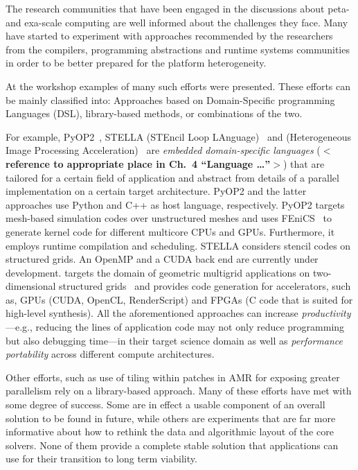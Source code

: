 The research communities that have been engaged in the discussions
about peta- and exa-scale computing are well informed about the
challenges they face.
\textcolor{fhcolor}{Many have started to experiment with approaches
recommended by the researchers from the compilers, programming
abstractions and runtime systems communities in order to be better
prepared for the platform heterogeneity.}%

At the workshop examples of many such efforts were presented.
\textcolor{fhcolor}{These efforts can be mainly classified into:
Approaches based on Domain-Specific programming Languages (DSL),
library-based methods, or combinations of the two.}

\textcolor{fhcolor}{
For example, PyOP2~\cite{PyOP2}, STELLA (STEncil Loop LAnguage)~\cite{STELLA14}
and \hipacc (Heterogeneous Image Processing Acceleration)~\cite{MHTKE12a} are
\emph{embedded domain-specific languages} (\textbf{$<$reference to appropriate place in Ch.~4 ``Language \ldots''$>$})
that are tailored for a certain field of application and abstract from details
of a parallel implementation on a certain target architecture. 
PyOP2 and the latter approaches use Python and C++ as host language,
respectively.
PyOP2 targets mesh-based simulation codes over unstructured meshes and uses
FEniCS~\cite{fenics} to generate kernel code for different multicore CPUs and GPUs.
Furthermore, it employs runtime compilation and scheduling.
STELLA considers stencil codes on structured grids. An OpenMP and a CUDA back
end are currently under development.  
\hipacc targets the domain of geometric multigrid applications on
two-dimensional structured grids~\cite{MHTK12} and provides code generation for
accelerators, such as, GPUs (CUDA, OpenCL, RenderScript) and FPGAs (C code that
is suited for high-level synthesis).
All the aforementioned approaches can increase \emph{productivity}---e.g.,
reducing the lines of application code may not only reduce programming but also
debugging time---in their target science domain as well as \emph{performance
portability} across different compute architectures.}

Other efforts, such as use of tiling within patches in AMR for
exposing greater parallelism rely on a library-based approach.
Many of these efforts
have met with some degree of success. Some are in effect a usable
component of an overall solution to be found in future, while others
are experiments that are far more informative about how to rethink the
data and algorithmic layout of the core solvers. None of them provide
a complete stable solution that applications can use for their
transition to long term viability. 

